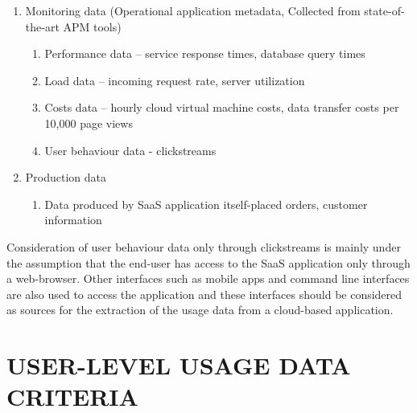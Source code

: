 \documentclass[a4paper,twoside]{article}
\begin{document}
\begin{enumerate}
\item Monitoring data (Operational application metadata, Collected from state-of-the-art APM tools)
	\begin{enumerate}
		\item Performance data – service response times, database query times
        \item Load data – incoming request rate, server utilization
        \item Costs data – hourly cloud virtual machine costs, data transfer costs per 10,000 page views
        \item User behaviour data - clickstreams
	\end{enumerate}
\item Production data
	\begin{enumerate}
	\item Data produced by SaaS application itself-placed orders, customer information
	\end{enumerate}
\end{enumerate}

Consideration of user behaviour data only through clickstreams is mainly under the assumption that the end-user has access to the SaaS application only through a web-browser. Other interfaces such as mobile apps and command line interfaces are also used to access the application and these interfaces should be considered as sources for the extraction of the usage data from a cloud-based application.


\section{USER-LEVEL USAGE DATA CRITERIA}
\label{sec:3 User-level usage data criteria}
\end{document}
